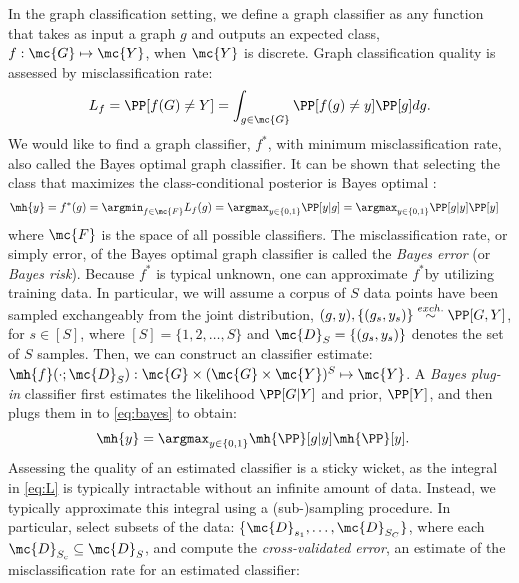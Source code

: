 In the graph classification setting, we define a graph classifier as any function that takes as input a graph $g$ and outputs an expected class, $f: \mc{G} \mapsto \mc{Y}$, when $\mc{Y}$ is discrete.  Graph classification quality is assessed by misclassification rate:
\begin{align} \label{eq:L}
	L_f = \PP[f(G) \neq Y] = \int_{g \in \mc{G}} \PP[f(g) \neq y]  \PP[g] dg.
\end{align}
We would like to find a graph classifier, $f^*$, with minimum misclassification rate, also called the Bayes optimal graph classifier. 
It can be shown that selecting the class that maximizes the class-conditional posterior is Bayes optimal \cite{DGL96}:
\begin{align} \label{eq:bayes}
	\mh{y} &= f^*(g) =\argmin_{f \in \mc{F}} L_f(g) = \argmax_{y \in \{0,1\}} \PP[y | g] 
	= \argmax_{y \in \{0,1\}} \PP[g | y] \PP[y]  
\end{align}
where $\mc{F}$ is the space of all possible classifiers. The misclassification rate, or simply error, of the Bayes optimal graph classifier is called the \emph{Bayes error} (or \emph{Bayes risk}).  Because $f^*$ is typical unknown, one can approximate $f^*$by utilizing training data. In particular, we will assume a corpus of $S$ data points have been sampled exchangeably from the joint distribution, $(g,y), \{(g_s,y_s)\} \overset{exch.}{\sim} \PP[G,Y]$, for $s \in [S]$, where $[S]=\{1,2,\ldots, S\}$ and
  $\mc{D}_S =\{(g_s,y_s)\}$ denotes the set of $S$ samples.  Then, we can construct an classifier estimate: $\mh{f}(\cdot; \mc{D}_S): \mc{G} \times (\mc{G} \times \mc{Y})^S \mapsto \mc{Y}$.  
A \emph{Bayes plug-in} classifier first estimates the likelihood $\PP[G|Y]$ and prior, $\PP[Y]$, and then plugs them in to \eqref{eq:bayes} to obtain:
\begin{align} \label{eq:plugin}
	\mh{y} &= \argmax_{y \in \{0,1\}} \mh{\PP}[g | y] \mh{\PP}[y].  
\end{align}
Assessing the quality of an estimated classifier is a sticky wicket, as the integral in \eqref{eq:L} is typically intractable without an infinite amount of data.  Instead, we typically approximate this integral using a (sub-)sampling procedure.  In particular, select subsets of the data: \{$\mc{D}_{s_1},\ldots, \mc{D}_{S_C}\}$, where each $\mc{D}_{S_c} \subseteq \mc{D}_S$, and compute the \emph{cross-validated error}, an estimate of the misclassification rate for an estimated classifier:
